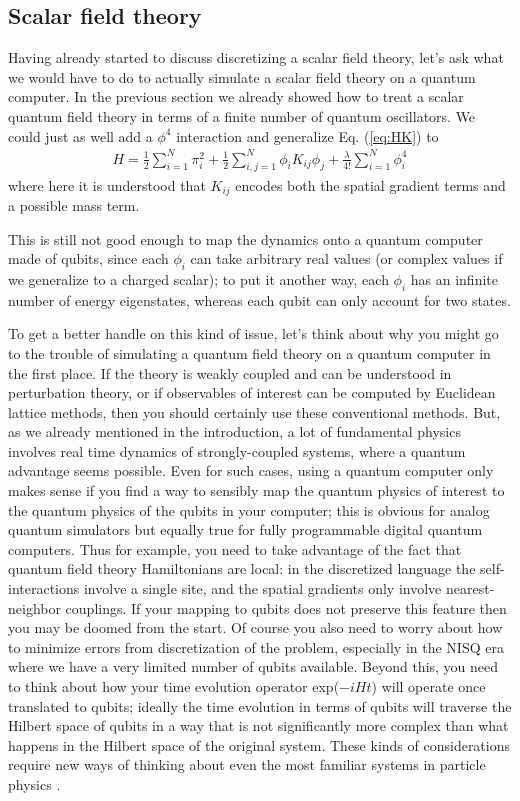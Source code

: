 \documentclass[a4paper,11pt]{article}
\begin{document}
\subsection{Scalar field theory}\label{ss:scalarft}
Having already started to discuss discretizing a scalar field theory, let's ask what we would have to do to actually simulate a scalar field theory on a
quantum computer. In the previous section we already showed how to treat a scalar quantum field theory in terms of a finite number of quantum oscillators. We could just
as well add a $\phi^4$ interaction and generalize Eq. (\ref{eq:HK}) to 
\begin{eqnarray}
H = \frac{1}{2} \sum_{i=1}^{N} \pi_i^2 + \frac{1}{2}  \sum_{i,j=1}^{N} \phi_i K_{ij} \phi_j + \frac{\lambda}{4!} \sum_{i=1}^{N} \phi_i^4
\label{eq:HK2}
\end{eqnarray}
where here it is understood that $K_{ij}$ encodes both the spatial gradient terms and a possible mass term. 

This is still not good enough to map the dynamics onto a quantum computer made of qubits, since each $\phi_i$ can take arbitrary real values
(or complex values if we generalize to a charged scalar); to put it another way, each $\phi_i$ has an infinite number of energy eigenstates,
whereas each qubit can only account for two states. 

To get a better handle on this kind of issue, let's think about why you might go to the trouble of simulating a quantum field theory on a quantum
computer in the first place. If the theory is weakly coupled and can be understood in perturbation theory, or if observables of interest can be
computed by Euclidean lattice methods, then you should certainly use these conventional methods. But, as we already mentioned in the introduction,
a lot of fundamental physics involves real time dynamics of strongly-coupled systems, where a quantum advantage seems possible. Even for such
cases, using a quantum computer only makes sense if you find a way to sensibly map the quantum physics of interest to the quantum physics of the
qubits in your computer; this is obvious for analog quantum simulators but equally true for fully programmable digital quantum computers.
Thus for example, you need to take advantage of the fact that quantum field theory Hamiltonians are local: in the discretized language the self-interactions
involve a single site, and the spatial gradients only involve nearest-neighbor couplings. If your mapping to qubits does not preserve this feature then you
may be doomed from the start. Of course you also need to worry about how to minimize errors from discretization of the problem, especially in the NISQ
era where we have a very limited number of qubits available.
Beyond this, you need to think about how your time evolution operator exp($-iHt$) will operate once translated to qubits;
ideally the time evolution in terms of qubits will traverse the Hilbert space of qubits in a way that is not significantly more complex than what happens
in the Hilbert space of the original system. These kinds of considerations require new ways of thinking about even the most familiar systems in
particle physics \cite{Jordan:2011ne,Jordan:2011ci}.
\end{document}
